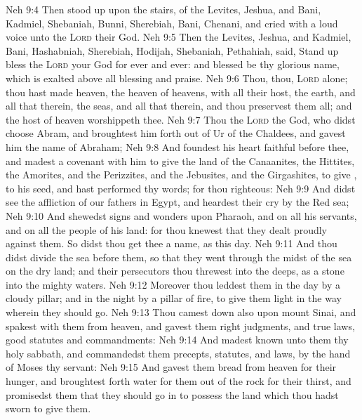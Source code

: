\vs Neh 9:4 Then stood up upon the stairs, of the Levites, Jeshua, and Bani, Kadmiel, Shebaniah, Bunni, Sherebiah, Bani,  Chenani, and cried with a loud voice unto the \textsc{Lord} their God.
\vs Neh 9:5 Then the Levites, Jeshua, and Kadmiel, Bani, Hashabniah, Sherebiah, Hodijah, Shebaniah,  Pethahiah, said, Stand up  bless the \textsc{Lord} your God for ever and ever: and blessed be thy glorious name, which is exalted above all blessing and praise.
\vs Neh 9:6 Thou,  thou,  \textsc{Lord} alone; thou hast made heaven, the heaven of heavens, with all their host, the earth, and all  that  therein, the seas, and all that  therein, and thou preservest them all; and the host of heaven worshippeth thee.
\vs Neh 9:7 Thou  the \textsc{Lord} the God, who didst choose Abram, and broughtest him forth out of Ur of the Chaldees, and gavest him the name of Abraham;
\vs Neh 9:8 And foundest his heart faithful before thee, and madest a covenant with him to give the land of the Canaanites, the Hittites, the Amorites, and the Perizzites, and the Jebusites, and the Girgashites, to give , to his seed, and hast performed thy words; for thou  righteous:
\vs Neh 9:9 And didst see the affliction of our fathers in Egypt, and heardest their cry by the Red sea;
\vs Neh 9:10 And shewedst signs and wonders upon Pharaoh, and on all his servants, and on all the people of his land: for thou knewest that they dealt proudly against them. So didst thou get thee a name, as  this day.
\vs Neh 9:11 And thou didst divide the sea before them, so that they went through the midst of the sea on the dry land; and their persecutors thou threwest into the deeps, as a stone into the mighty waters.
\vs Neh 9:12 Moreover thou leddest them in the day by a cloudy pillar; and in the night by a pillar of fire, to give them light in the way wherein they should go.
\vs Neh 9:13 Thou camest down also upon mount Sinai, and spakest with them from heaven, and gavest them right judgments, and true laws, good statutes and commandments:
\vs Neh 9:14 And madest known unto them thy holy sabbath, and commandedst them precepts, statutes, and laws, by the hand of Moses thy servant:
\vs Neh 9:15 And gavest them bread from heaven for their hunger, and broughtest forth water for them out of the rock for their thirst, and promisedst them that they should go in to possess the land which thou hadst sworn to give them.
